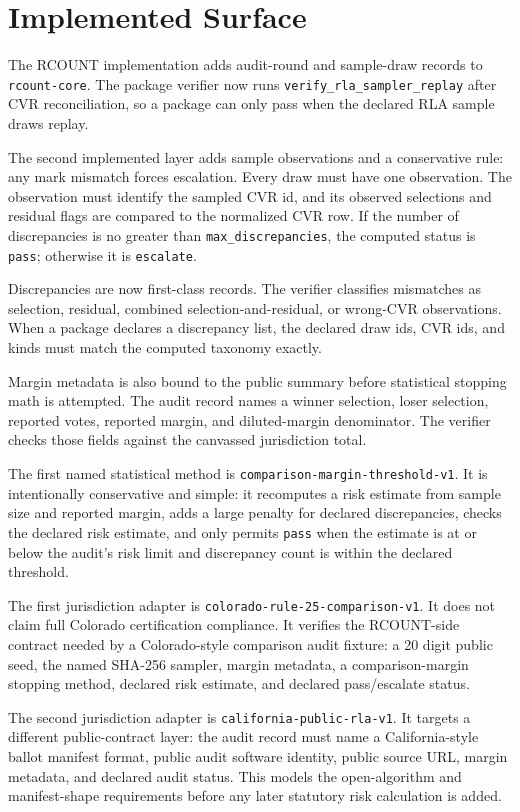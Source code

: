 \section{Implemented Surface}

The RCOUNT implementation adds audit-round and sample-draw records to
\texttt{rcount-core}. The package verifier now runs
\texttt{verify\_rla\_sampler\_replay} after CVR reconciliation, so a package
can only pass when the declared RLA sample draws replay.

The second implemented layer adds sample observations and a conservative rule:
any mark mismatch forces escalation. Every draw must have one observation. The
observation must identify the sampled CVR id, and its observed selections and
residual flags are compared to the normalized CVR row. If the number of
discrepancies is no greater than \texttt{max\_discrepancies}, the computed
status is \texttt{pass}; otherwise it is \texttt{escalate}.

Discrepancies are now first-class records. The verifier classifies mismatches
as selection, residual, combined selection-and-residual, or wrong-CVR
observations. When a package declares a discrepancy list, the declared
draw ids, CVR ids, and kinds must match the computed taxonomy exactly.

Margin metadata is also bound to the public summary before statistical stopping
math is attempted. The audit record names a winner selection, loser selection,
reported votes, reported margin, and diluted-margin denominator. The verifier
checks those fields against the canvassed jurisdiction total.

The first named statistical method is
\texttt{comparison-margin-threshold-v1}. It is intentionally conservative and
simple: it recomputes a risk estimate from sample size and reported margin,
adds a large penalty for declared discrepancies, checks the declared risk
estimate, and only permits \texttt{pass} when the estimate is at or below the
audit's risk limit and discrepancy count is within the declared threshold.

The first jurisdiction adapter is
\texttt{colorado-rule-25-comparison-v1}. It does not claim full Colorado
certification compliance. It verifies the RCOUNT-side contract needed by a
Colorado-style comparison audit fixture: a 20 digit public seed, the named
SHA-256 sampler, margin metadata, a comparison-margin stopping method, declared
risk estimate, and declared pass/escalate status.

The second jurisdiction adapter is \texttt{california-public-rla-v1}. It
targets a different public-contract layer: the audit record must name a
California-style ballot manifest format, public audit software identity, public
source URL, margin metadata, and declared audit status. This models the
open-algorithm and manifest-shape requirements before any later statutory risk
calculation is added.

